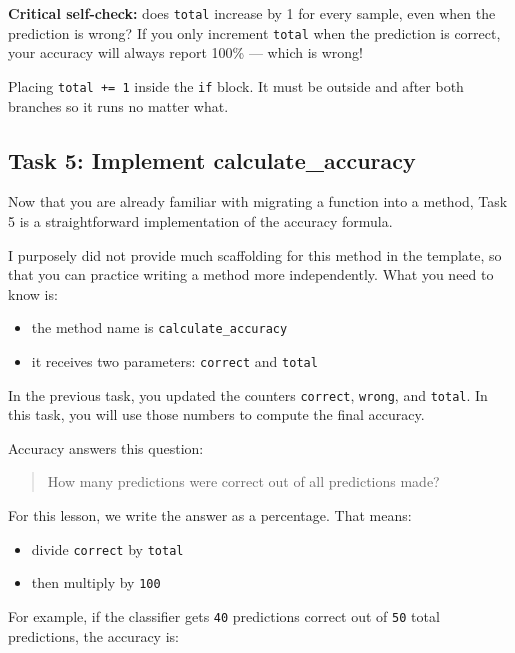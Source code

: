 \begin{tcolorbox}[title=Checkpoint]
\textbf{Critical self-check:} does \texttt{total} increase by 1 for every sample, even when the prediction is wrong?
If you only increment \texttt{total} when the prediction is correct, your accuracy will always report 100\% --- which is wrong!
\end{tcolorbox}

\begin{tcolorbox}[title=Common Mistake]
Placing \texttt{total += 1} inside the \texttt{if} block.
It must be outside and after both branches so it runs no matter what.
\end{tcolorbox}

\subsection{Task 5: Implement calculate\_accuracy}
Now that you are already familiar with migrating a function into a method, Task 5 is a straightforward implementation of the accuracy formula.


I purposely did not provide much scaffolding for this method in the template, so that you can practice writing a method more independently.
What you need to know is:

\begin{itemize}\setlength{\itemsep}{2pt}
    \item the method name is \texttt{calculate\_accuracy}
    \item it receives two parameters: \texttt{correct} and \texttt{total}
\end{itemize}


In the previous task, you updated the counters \texttt{correct}, \texttt{wrong}, and \texttt{total}.
In this task, you will use those numbers to compute the final accuracy.


Accuracy answers this question:
\begin{quote}
How many predictions were correct out of all predictions made?
\end{quote}

\noindent
For this lesson, we write the answer as a percentage.
That means:
\begin{itemize}\setlength{\itemsep}{2pt}
    \item divide \texttt{correct} by \texttt{total}
    \item then multiply by \texttt{100}
\end{itemize}

\noindent
For example, if the classifier gets \texttt{40} predictions correct out of \texttt{50} total predictions, the accuracy is:

